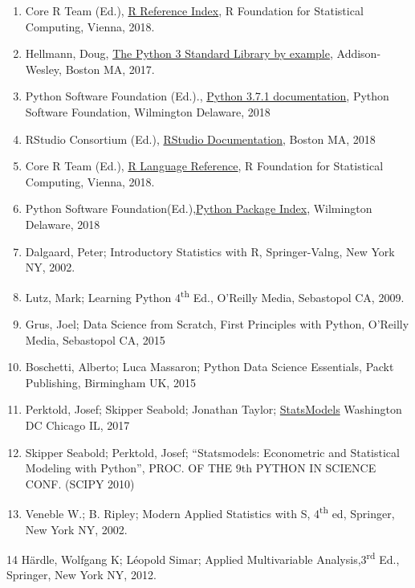 \documentclass[]{book}
\theoremstyle{definition}
\theoremstyle{definition}
\theoremstyle{definition}
\theoremstyle{remark}
\begin{document}
\begin{enumerate}
\def\labelenumi{\arabic{enumi}.}
\item
  Core R Team (Ed.),
  \href{https://cran.cnr.berkeley.edu/doc/manuals/r-release/fullrefman.pdf}{R
  Reference Index}, R Foundation for Statistical Computing, Vienna,
  2018.
\item
  Hellmann, Doug,
  \href{https://www.amazon.com/Python-Standard-Library-Example-Developers-ebook/dp/B072QZZDV7}{The
  Python 3 Standard Library by example}, Addison-Wesley, Boston MA,
  2017.
\item
  Python Software Foundation (Ed.).,
  \href{https://docs.python.org/3.7/}{Python 3.7.1 documentation},
  Python Software Foundation, Wilmington Delaware, 2018
\item
  RStudio Consortium (Ed.),
  \href{https://support.rstudio.com/hc/en-us/categories/200035113-Documentation}{RStudio
  Documentation}, Boston MA, 2018
\item
  Core R Team (Ed.),
  \href{https://cran.r-project.org/doc/manuals/r-release/R-lang.html}{R
  Language Reference}, R Foundation for Statistical Computing, Vienna,
  2018.
\item
  Python Software Foundation(Ed.),\href{https://pypi.org/}{Python
  Package Index}, Wilmington Delaware, 2018
\item
  Dalgaard, Peter; Introductory Statistics with R, Springer-Valng, New
  York NY, 2002.
\item
  Lutz, Mark; Learning Python 4\textsuperscript{th} Ed., O'Reilly Media,
  Sebastopol CA, 2009.
\item
  Grus, Joel; Data Science from Scratch, First Principles with Python,
  O'Reilly Media, Sebastopol CA, 2015
\item
  Boschetti, Alberto; Luca Massaron; Python Data Science Essentials,
  Packt Publishing, Birmingham UK, 2015
\item
  Perktold, Josef; Skipper Seabold; Jonathan Taylor;
  \href{https://www.statsmodels.org/stable/index.html}{StatsModels}
  Washington DC Chicago IL, 2017
\item
  Skipper Seabold; Perktold, Josef; ``Statsmodels: Econometric and
  Statistical Modeling with Python'', PROC. OF THE 9th PYTHON IN SCIENCE
  CONF. (SCIPY 2010)
\item
  Veneble W.; B. Ripley; Modern Applied Statistics with S,
  4\textsuperscript{th} ed, Springer, New York NY, 2002.
\end{enumerate}

14 Härdle, Wolfgang K; Léopold Simar; Applied Multivariable
Analysis,3\textsuperscript{rd} Ed., Springer, New York NY, 2012.
\end{document}

